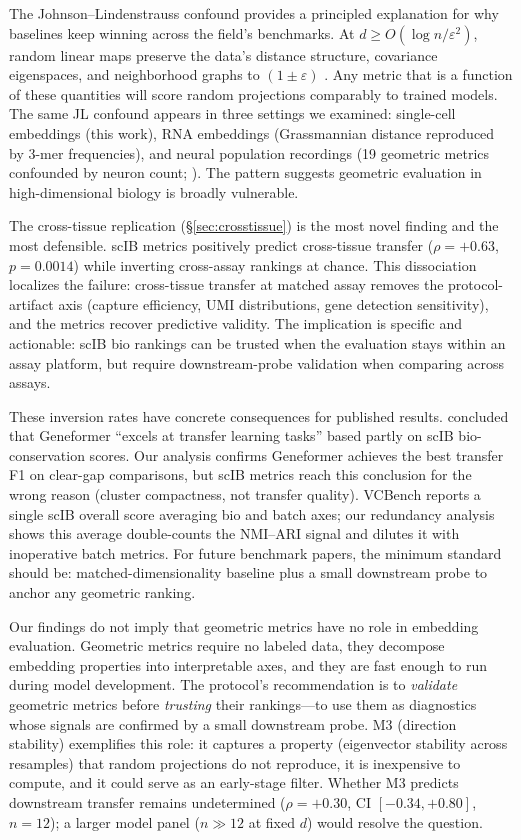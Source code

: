 \documentclass[10pt,letterpaper]{article}
\begin{document}
The Johnson--Lindenstrauss confound provides a principled explanation for why baselines keep winning across the field's benchmarks. At $d \geq O(\log n / \varepsilon^2)$, random linear maps preserve the data's distance structure, covariance eigenspaces, and neighborhood graphs to $(1 \pm \varepsilon)$ \citep{johnsonlindenstrauss1984}. Any metric that is a function of these quantities will score random projections comparably to trained models. The same JL confound appears in three settings we examined: single-cell embeddings (this work), RNA embeddings (Grassmannian distance reproduced by 3-mer frequencies), and neural population recordings (19 geometric metrics confounded by neuron count; \citealp{tower2026bracket}). The pattern suggests geometric evaluation in high-dimensional biology is broadly vulnerable.

The cross-tissue replication (\S\ref{sec:crosstissue}) is the most novel finding and the most defensible. scIB metrics positively predict cross-tissue transfer ($\rho = +0.63$, $p = 0.0014$) while inverting cross-assay rankings at chance. This dissociation localizes the failure: cross-tissue transfer at matched assay removes the protocol-artifact axis (capture efficiency, UMI distributions, gene detection sensitivity), and the metrics recover predictive validity. The implication is specific and actionable: scIB bio rankings can be trusted when the evaluation stays within an assay platform, but require downstream-probe validation when comparing across assays.

These inversion rates have concrete consequences for published results. \citet{wu2025scfm} concluded that Geneformer ``excels at transfer learning tasks'' based partly on scIB bio-conservation scores. Our analysis confirms Geneformer achieves the best transfer F1 on clear-gap comparisons, but scIB metrics reach this conclusion for the wrong reason (cluster compactness, not transfer quality). VCBench \citep{vcbench2026} reports a single scIB overall score averaging bio and batch axes; our redundancy analysis shows this average double-counts the NMI--ARI signal and dilutes it with inoperative batch metrics. For future benchmark papers, the minimum standard should be: matched-dimensionality baseline plus a small downstream probe to anchor any geometric ranking.

Our findings do not imply that geometric metrics have no role in embedding evaluation. Geometric metrics require no labeled data, they decompose embedding properties into interpretable axes, and they are fast enough to run during model development. The protocol's recommendation is to \emph{validate} geometric metrics before \emph{trusting} their rankings---to use them as diagnostics whose signals are confirmed by a small downstream probe. M3 (direction stability) exemplifies this role: it captures a property (eigenvector stability across resamples) that random projections do not reproduce, it is inexpensive to compute, and it could serve as an early-stage filter. Whether M3 predicts downstream transfer remains undetermined ($\rho = +0.30$, CI $[-0.34, +0.80]$, $n = 12$); a larger model panel ($n \gg 12$ at fixed $d$) would resolve the question.
\end{document}
